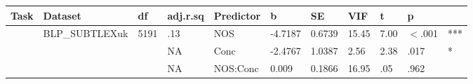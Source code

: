 \begin{table}[ht]
\centering
\begingroup\normalsize
\begin{tabular}{lllllllllll}
  \hline
Task & Dataset & df & adj.r.sq & Predictor & b & SE & VIF & t & p &  \\ 
  \hline
 & BLP\_SUBTLEXuk & 5191 & .13 & NOS & -4.7187 & 0.6739 & 15.45 & 7.00 & $<$.001 & *** \\ 
   &  &  & NA & Conc & -2.4767 & 1.0387 & 2.56 & 2.38 & .017 & * \\ 
   &  &  & NA & NOS:Conc & 0.009 & 0.1866 & 16.95 & .05 & .962 &   \\ 
   \hline
\end{tabular}
\endgroup
\end{table}
